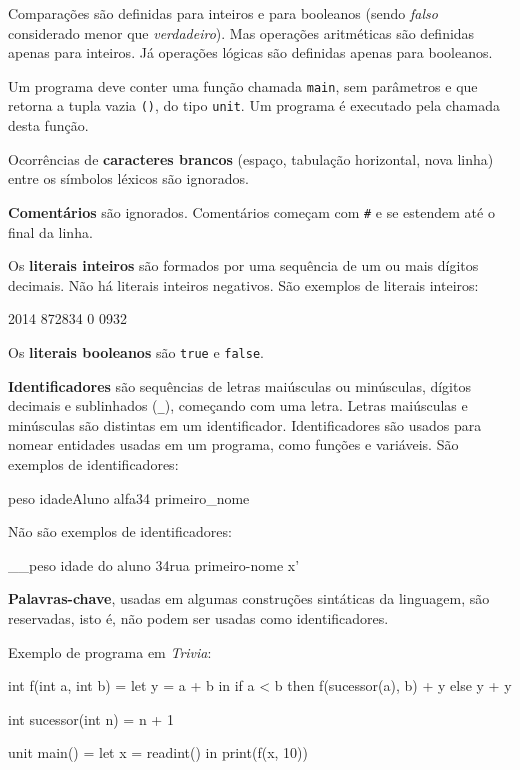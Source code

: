 \documentclass[a4paper,11pt,brazil]{article}
\newcommand{\lang}{\textsl{Trivia}}
\begin{document}
Comparações são definidas para inteiros e para booleanos (sendo
\emph{falso} considerado menor que \emph{verdadeiro}). Mas operações
aritméticas são definidas apenas para inteiros. Já operações lógicas
são definidas apenas para booleanos.

Um programa deve conter uma função chamada \texttt{main}, sem
parâmetros e que retorna a tupla vazia \texttt{()}, do tipo
\texttt{unit}. Um programa é executado pela chamada desta função.

Ocorrências de \textbf{caracteres brancos} (espaço, tabulação
horizontal, nova linha) entre os símbolos léxicos são ignorados.

\textbf{Comentários} são ignorados. Comentários começam com
\texttt{\#} e se estendem até o final da linha.

Os \textbf{literais inteiros} são formados por uma sequência de um ou
mais dígitos decimais. Não há literais inteiros negativos. São
exemplos de literais inteiros:
\begin{pygmented}[lang=text]
2014
872834
0
0932
\end{pygmented}

Os \textbf{literais booleanos} são \texttt{true} e \texttt{false}.

\textbf{Identificadores} são sequências de letras maiúsculas ou
minúsculas, dígitos decimais e sublinhados (\texttt{\_}), começando
com uma letra. Letras maiúsculas e minúsculas são distintas em um
identificador. Identificadores são usados para nomear entidades usadas
em um programa, como funções e variáveis. São exemplos de
identificadores:
\begin{pygmented}[lang=text]
peso
idadeAluno
alfa34
primeiro_nome
\end{pygmented}

Não são exemplos de identificadores:
\begin{pygmented}[lang=text]
__peso
idade do aluno
34rua
primeiro-nome
x'
\end{pygmented}

\textbf{Palavras-chave}, usadas em algumas construções sintáticas da
linguagem, são reservadas, isto é, não podem ser usadas como
identificadores.

Exemplo de programa em \lang{}:
\begin{pygmented}[lang=text]
int f(int a, int b) =
  let y = a + b
  in
    if a < b then
      f(sucessor(a), b) + y
    else
      y + y

int sucessor(int n) =
  n + 1

unit main() =
  let x = readint() in
    print(f(x, 10))
\end{pygmented}
\end{document}
